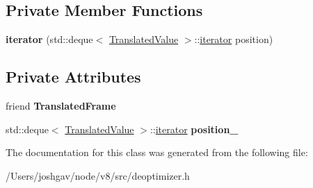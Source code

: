 \subsection*{Private Member Functions}
\begin{DoxyCompactItemize}
\item 
{\bfseries iterator} (std\+::deque$<$ \hyperlink{classv8_1_1internal_1_1_translated_value}{Translated\+Value} $>$\+::\hyperlink{classv8_1_1internal_1_1_translated_frame_1_1iterator}{iterator} position)\hypertarget{classv8_1_1internal_1_1_translated_frame_1_1iterator_a65c0c197595312ba84da4147c2844009}{}\label{classv8_1_1internal_1_1_translated_frame_1_1iterator_a65c0c197595312ba84da4147c2844009}

\end{DoxyCompactItemize}
\subsection*{Private Attributes}
\begin{DoxyCompactItemize}
\item 
friend {\bfseries Translated\+Frame}\hypertarget{classv8_1_1internal_1_1_translated_frame_1_1iterator_a36a97f52a261bebfac6fc4efe3023757}{}\label{classv8_1_1internal_1_1_translated_frame_1_1iterator_a36a97f52a261bebfac6fc4efe3023757}

\item 
std\+::deque$<$ \hyperlink{classv8_1_1internal_1_1_translated_value}{Translated\+Value} $>$\+::\hyperlink{classv8_1_1internal_1_1_translated_frame_1_1iterator}{iterator} {\bfseries position\+\_\+}\hypertarget{classv8_1_1internal_1_1_translated_frame_1_1iterator_a60a3a647ce2bf1301ff8d43aa52cc050}{}\label{classv8_1_1internal_1_1_translated_frame_1_1iterator_a60a3a647ce2bf1301ff8d43aa52cc050}

\end{DoxyCompactItemize}


The documentation for this class was generated from the following file\+:\begin{DoxyCompactItemize}
\item 
/\+Users/joshgav/node/v8/src/deoptimizer.\+h\end{DoxyCompactItemize}
